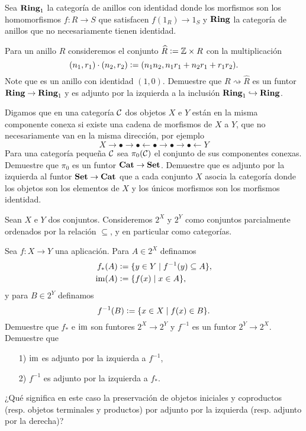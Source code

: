 \begin{ejerc}
  Sea $\text{\bf Ring}_1$ la categoría de anillos con identidad donde los morfismos
  son los homomorfismos $f\colon R\to S$ que satisfacen $f (1_R) \to 1_S$ y
  $\text{\bf Ring}$ la categoría de anillos que no necesariamente tienen identidad.

  Para un anillo $R$ consideremos el conjunto $\widehat{R} \mathrel{\mathop:}= \mathbb{Z}\times R$ con
  la multiplicación
  $$(n_1, r_1)\cdot (n_2, r_2) \mathrel{\mathop:}= (n_1 n_2, n_1 r_1 + n_2 r_1 + r_1 r_2).$$
  Note que es un anillo con identidad $(1,0)$. Demuestre que
  $R \rightsquigarrow \widehat{R}$ es un funtor
  $\text{\bf Ring} \to \text{\bf Ring}_1$ y es adjunto por la izquierda a la inclusión
  $\text{\bf Ring}_1 \hookrightarrow \text{\bf Ring}$.
\end{ejerc}

\begin{ejerc}
  Digamos que en una categoría $\mathcal{C}$ dos objetos $X$ e $Y$ están en la
  misma componente conexa si existe una cadena de morfismos de $X$ a $Y$, que no
  necesariamente van en la misma dirección, por ejemplo
  $$X \rightarrow \bullet \rightarrow \bullet \leftarrow
    \bullet \rightarrow \bullet \rightarrow \bullet \leftarrow Y$$
  Para una categoría pequeña $\mathcal{C}$ sea $\pi_0 (\mathcal{C})$ el conjunto
  de sus componentes conexas. Demuestre que $\pi_0$ es un funtor
  $\text{\bf Cat} \to \text{\bf Set}$. Demuestre que es adjunto por la izquierda al
  funtor $\text{\bf Set} \to \text{\bf Cat}$ que a cada conjunto $X$ asocia la
  categoría donde los objetos son los elementos de $X$ y los únicos morfismos
  son los morfismos identidad.
\end{ejerc}

\begin{ejerc}
  Sean $X$ e $Y$ dos conjuntos. Consideremos $2^X$ y $2^Y$ como conjuntos
  parcialmente ordenados por la relación $\subseteq$, y en particular como
  categorías.

  Sea $f\colon X\to Y$ una aplicación. Para $A\in 2^X$ definamos
  \begin{align*}
    f_* (A) & \mathrel{\mathop:}= \{ y\in Y \mid f^{-1} (y) \subseteq A \},\\
    \operatorname{im} (A) & \mathrel{\mathop:}= \{ f (x) \mid x\in A \},
  \end{align*}
  y para $B\in 2^Y$ definamos
  $$f^{-1} (B) \mathrel{\mathop:}= \{ x\in X \mid f (x) \in B \}.$$
  Demuestre que $f_*$ e $\operatorname{im}$ son funtores $2^X\to 2^Y$ y $f^{-1}$ es un funtor
  $2^Y \to 2^X$. Demuestre que

  \begin{enumerate}
  \item[1)] $\operatorname{im}$ es adjunto por la izquierda a $f^{-1}$,

  \item[2)] $f^{-1}$ es adjunto por la izquierda a $f_*$.
  \end{enumerate}

  ¿Qué significa en este caso la preservación de objetos iniciales y coproductos
  (resp. objetos terminales y productos) por adjunto por la izquierda
  (resp. adjunto por la derecha)?
\end{ejerc}

